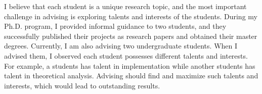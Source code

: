 \documentclass[a4paper, 11pt]{article}
\begin{document}
\begin{small}
I believe that each student is a unique research topic, and the most important challenge in advising is exploring talents and interests of the students.
During my Ph.D. program, I provided informal guidance to two students, and they successfully published their projects as research papers and obtained their master degrees. Currently, I am also advising two undergraduate students.
When I advised them, I observed each student possesses different talents and interests.
For example, a students has talent in implementation while another students has talent in theoretical analysis. 
Advising should find and maximize such talents and interests, which would lead to outstanding results.











%





















\end{small}
\end{document}
